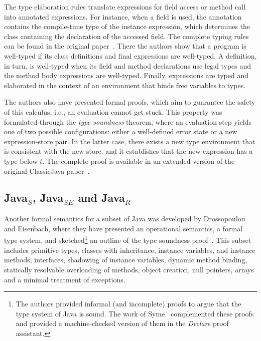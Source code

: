 \documentclass[tese,capa,english]{texufpel}
\begin{document}

The type elaboration rules translate expressions for field access or method call into annotated expressions. For instance, when a field is used, the annotation contains the compile-time type of the instance expression, which determines the class containing the declaration of the accessed field. The complete typing rules can be found in the original paper~\cite{Flatt:1998:CM:268946.268961}. There the authors show that a program is well-typed if its class definitions and final expressions are well-typed. A definition, in turn, is well-typed when its field and method declarations use legal types and the method body expressions are well-typed. Finally, expressions are typed and elaborated in the context of an environment that binds free variables to types.

The authors also have presented formal proofs, which aim to guarantee the safety of this calculus, i.e., an evaluation cannot get stuck. This property was formulated through the \emph{type soundness} theorem, where an evaluation step yields one of two possible configurations: either a well-defined error state or a new expression-store pair. In the latter case, there exists a new type environment that is consistent with the new store, and it establishes that the new expression has a type below $t$. The complete proof is available in an extended version of the original ClassicJava paper~\cite{Flatt:1999:PRS:645580.658808}.

\subsection{Java$_S$, Java$_{SE}$ and Java$_R$}
Another formal semantics for a subset of Java was developed by Drossopoulou and Eisenbach, where they have presented an operational semantics, a formal type system, and sketched\footnote{The authors provided informal (and incomplete) proofs to argue that the type system of Java is sound. The work of Syme~\cite{Syme:1999:PJT:645580.658814} complemented these proofs and provided a  machine-checked version of them in the \emph{Declare} proof assistant.} an outline of the type soundness proof~\cite{Drossopoulou97javais,Drossopoulou:1999:JTS:308181.308189,Drossopoulou:1999:DSJ:645580.658817}. This subset includes primitive types, classes with inheritance, instance variables, and instance methods, interfaces, shadowing of instance variables, dynamic method binding, statically resolvable overloading of methods, object creation, null pointers, arrays and a minimal treatment of exceptions.
\end{document}
